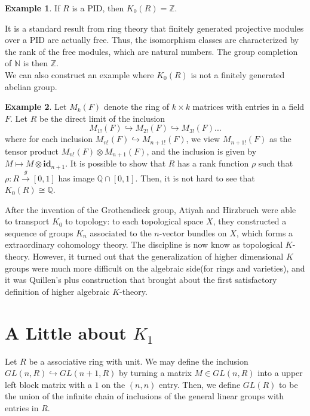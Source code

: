 \documentclass{article}
\theoremstyle{definition}
\theoremstyle{definition}
\theoremstyle{definition}
\theoremstyle{definition}
\theoremstyle{definition}
\theoremstyle{definition}
\theoremstyle{definition}
\newtheorem{example}{Example}[theorem]
\begin{document}
\begin{tcolorbox}[colback=yellow!5!white,colframe=yellow!30!white]
\begin{example}
    If $R$ is a PID, then $K_0(R)=\mathbb{Z}$.
\end{example}
\end{tcolorbox}
It is a standard result from ring theory that finitely generated projective modules over a PID are actually free. Thus, the isomorphism classes are characterized by the rank of the free modules, which are natural numbers. The group completion of $\mathbb{N}$ is then $\mathbb{Z}$. \\


We can also construct an example where $K_0(R)$ is not a finitely generated abelian group. 

\begin{tcolorbox}[colback=yellow!5!white,colframe=yellow!30!white]
\begin{example}
    Let $M_k(F)$ denote the ring of $k\times k$ matrices with entries in a field $F$. Let $R$ be the direct limit of the inclusion 
    \[
    M_{1!}(F)\hookrightarrow M_{2!}(F)\hookrightarrow M_{3!}(F)...
    \]
    where for each inclusion $M_{n!}(F)\hookrightarrow M_{n+1!}(F)$, we view $M_{n+1!}(F)$ as the tensor product $M_{n!}(F)\otimes M_{n+1}(F)$, and the inclusion is given by $M\mapsto M\otimes \textbf{id}_{n+1}$. 
    It is possible to show that $R$ has a rank function $\rho$ such that $\rho: R\xrightarrow{g}[0,1]$ has image $\mathbb{Q}\cap [0,1]$. Then, it is not hard to see that $K_0(R)\cong \mathbb{Q}$.
\end{example}
\end{tcolorbox}


After the invention of the Grothendieck group, Atiyah and Hirzbruch were able to transport $K_0$ to topology: to each topological space $X$, they constructed a sequence of groups $K_n$ associated to the $n$-vector bundles on $X$, which forms a extraordinary cohomology theory. The discipline is now know as topological $K$-theory. However, it turned out that the generalization of higher dimensional $K$ groups were much more difficult on the algebraic side(for rings and varieties), and it was Quillen's plus construction that brought about the first satisfactory definition of higher algebraic $K$-theory.

\section{A Little about $K_1$}
Let $R$ be a associative ring with unit. We may define the inclusion $GL(n,R)\hookrightarrow GL(n+1,R)$ by turning a matrix $M\in GL(n,R)$ into a upper left block matrix with a $1$ on the $(n,n)$ entry. Then, we define $GL(R)$ to be the union of the infinite chain of inclusions of the general linear groups with entries in $R$.
\end{document}
